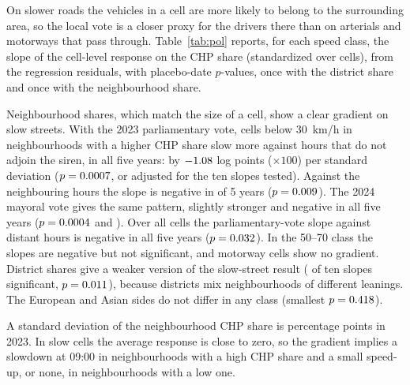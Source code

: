 \documentclass[11pt,a4paper]{article}
\newcommand{\Tab}[1]{\begin{center}\footnotesize\setlength{\tabcolsep}{4.5pt}\end{center}}
\begin{document}
On slower roads the vehicles in a cell are more likely to belong to the surrounding area, so the
local vote is a closer proxy for the drivers there than on arterials and motorways that pass
through. Table~\ref{tab:pol} reports, for each speed class, the slope of the cell-level response on
the CHP share (standardized over cells), from the regression residuals, with placebo-date
$p$-values, once with the district share and once with the neighbourhood share.

Neighbourhood shares, which match the size of a cell, show a clear gradient on slow streets. With
the 2023 parliamentary vote, cells below 30~km/h in neighbourhoods with a higher CHP share slow more
against hours that do not adjoin the siren, in all five years: by $-1.08$ log points
($\times 100$) per standard deviation ($p = 0.0007$, or \pSlopeGeneralFarSlowHolm{}
adjusted for the ten slopes tested). Against the neighbouring hours the slope is negative in
\negSlopeGeneralMainSlow{} of 5 years ($p = 0.009$). The 2024 mayoral vote gives the
same pattern, slightly stronger and negative in all five years ($p = 0.0004$ and
\pSlopeNeighbourhoodMainSlow). Over all cells the parliamentary-vote slope against distant hours is
negative in all five years ($p = 0.032$). In the 50--70 class the slopes are negative
but not significant, and motorway cells show no gradient. District shares give a weaker version of
the slow-street result (\nSigDistrict{} of ten slopes significant, $p = 0.011$),
because districts mix neighbourhoods of different leanings. The European and Asian sides do not
differ in any class (smallest $p = 0.418$).

A standard deviation of the neighbourhood CHP share is \sdChpGeneral{} percentage points in 2023. In slow
cells the average response is close to zero, so the gradient implies a slowdown at 09:00 in
neighbourhoods with a high CHP share and a small speed-up, or none, in neighbourhoods with a low one.

\begin{table}[t]\centering
\caption{Political gradient. Slope of the cell-level event response on the CHP vote share (standardized over
cells): district share in the 2024 mayoral election, and neighbourhood shares in the 2023
parliamentary and 2024 mayoral elections, by usual 09:00 speed, in log points
$\times 100$ per standard deviation. A negative slope means a larger slowdown where the CHP
share is higher. Superscripts count the years (of five) with a negative slope. $p$-values are
two-sided placebo-date $p$-values. The neighbourhood share of a cell is area-weighted over the
neighbourhoods it overlaps.}
\label{tab:pol}
\Tab{politics}
\end{table}
\end{document}
